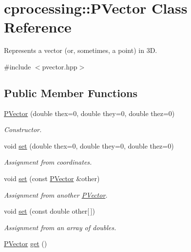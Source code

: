 \hypertarget{classcprocessing_1_1PVector}{\section{cprocessing\-:\-:\-P\-Vector \-Class \-Reference}
\label{classcprocessing_1_1PVector}
}


\-Represents a vector (or, sometimes, a point) in 3\-D.  




{\ttfamily \#include $<$pvector.\-hpp$>$}

\subsection*{\-Public \-Member \-Functions}
\begin{DoxyCompactItemize}
\item 
\hyperlink{classcprocessing_1_1PVector_a15b76552e4cd25913069e1e116fd754b}{\-P\-Vector} (double thex=0, double they=0, double thez=0)
\begin{DoxyCompactList}\small\item\em \-Constructor. \end{DoxyCompactList}\item 
void \hyperlink{classcprocessing_1_1PVector_aac9b5ec71572685079ceadb3e3760c01}{set} (double thex=0, double they=0, double thez=0)
\begin{DoxyCompactList}\small\item\em \-Assignment from coordinates. \end{DoxyCompactList}\item 
void \hyperlink{classcprocessing_1_1PVector_ad98c990027c6e271ccb226555426c8da}{set} (const \hyperlink{classcprocessing_1_1PVector}{\-P\-Vector} \&other)
\begin{DoxyCompactList}\small\item\em \-Assignment from another \hyperlink{classcprocessing_1_1PVector}{\-P\-Vector}. \end{DoxyCompactList}\item 
void \hyperlink{classcprocessing_1_1PVector_af8b3668b7e4cc1e70c21e2ed22e5275c}{set} (const double other\mbox{[}$\,$\mbox{]})
\begin{DoxyCompactList}\small\item\em \-Assignment from an array of doubles. \end{DoxyCompactList}\item 
\hyperlink{classcprocessing_1_1PVector}{\-P\-Vector} \hyperlink{classcprocessing_1_1PVector_af38e81bf00a54ebac621baa5472abc7b}{get} ()

\end{DoxyCompactItemize}
